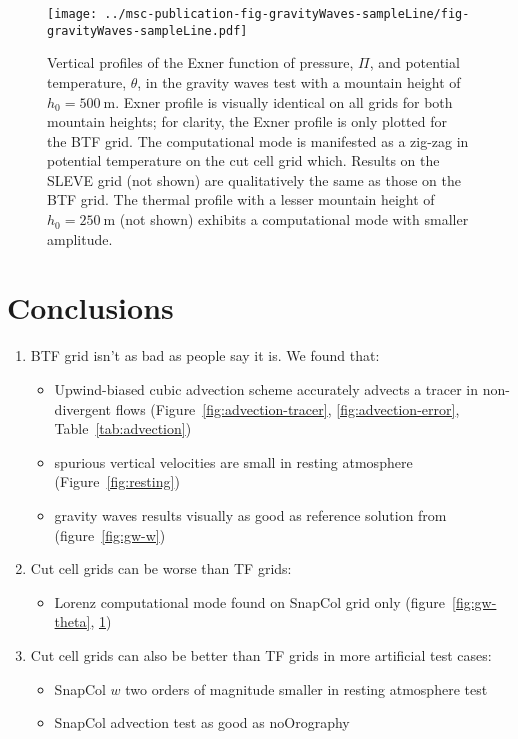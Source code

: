 \documentclass[twocol]{ametsoc}
\begin{document}
\begin{figure}
	\centering
	\texttt{[image: ../msc-publication-fig-gravityWaves-sampleLine/fig-gravityWaves-sampleLine.pdf]}
%
	\caption{Vertical profiles of the Exner function of pressure, \(\Pi\), and potential temperature, \(\theta\), in the gravity waves test with a mountain height of \(h_0 = \SI{500}{\meter}\).  Exner profile is visually identical on all grids for both mountain heights; for clarity, the Exner profile is only plotted for the BTF grid.  The computational mode is manifested as a zig-zag in potential temperature on the cut cell grid which.   Results on the SLEVE grid (not shown) are qualitatively the same as those on the BTF grid.  The thermal profile with a lesser mountain height of \(h_0 = \SI{250}{\meter}\) (not shown) exhibits a computational mode with smaller amplitude.}
	\label{fig:gw-exner-theta}
\end{figure}


\section{Conclusions}
\begin{enumerate}
	\item BTF grid isn't as bad as people say it is.  We found that:
	\begin{itemize}
		\item Upwind-biased cubic advection scheme accurately advects a tracer in non-divergent flows (Figure~\ref{fig:advection-tracer}, \ref{fig:advection-error}, Table~\ref{tab:advection})
		\item spurious vertical velocities are small in resting atmosphere (Figure~\ref{fig:resting})
		\item gravity waves results visually as good as reference solution from \citet{melvin2010} (figure~\ref{fig:gw-w})
	\end{itemize}

	\item Cut cell grids can be worse than TF grids:
	\begin{itemize}
		\item Lorenz computational mode found on SnapCol grid only (figure~\ref{fig:gw-theta}, \ref{fig:gw-exner-theta})
	\end{itemize}

	\item Cut cell grids can also be better than TF grids in more artificial test cases:
	\begin{itemize}
		\item SnapCol $w$ two orders of magnitude smaller in resting atmosphere test
		\item SnapCol advection test as good as noOrography
	\end{itemize}
\end{enumerate}
\end{document}
